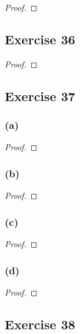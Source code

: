 \documentclass[14pt]{extarticle}
\begin{document}
\begin{proof}

\end{proof}

\subsection{Exercise 36}

\begin{proof}

\end{proof}

\subsection{Exercise 37}

\subsubsection{(a)}

\begin{proof}

\end{proof}

\subsubsection{(b)}

\begin{proof}

\end{proof}

\subsubsection{(c)}

\begin{proof}

\end{proof}

\subsubsection{(d)}

\begin{proof}

\end{proof}

\subsection{Exercise 38}
\end{document}
